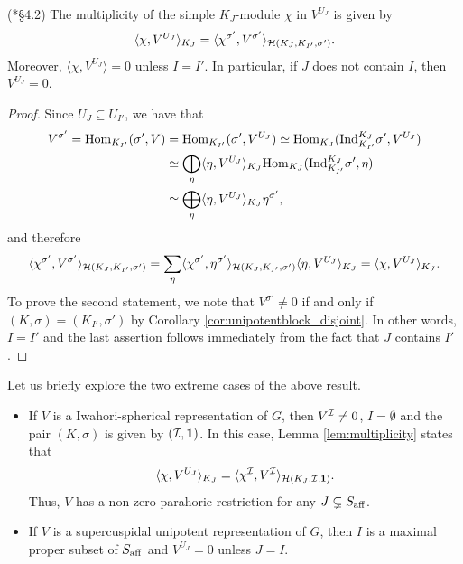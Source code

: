 \begin{lemma}\label{lem:multiplicity} (\cite{Reeder2000}*{\S 4.2})
    The multiplicity of the simple $K_J$-module $\chi$ in $V^{U_J}$ is given by 
    $$\langle\chi,V^{U_J}\rangle_{K_J}=\langle\chi^{\sigma'},V^{\sigma'}\rangle_{\mathcal{H}(K_J,K_{I'},\sigma')}.$$
    Moreover, $\langle\chi,V^{U_J}\rangle=0$ unless $I=I'$. In particular, if $J$ does not contain $I$, then $V^{U_J}=0$.
\end{lemma}
\begin{proof}
    Since $U_J\subseteq U_{I'}$, we have that
    \begin{align*}
        V^{\sigma'}=\mathrm{Hom}_{K_{I'}}(\sigma',V)&=\mathrm{Hom}_{K_{I'}}(\sigma',V^{U_J})\simeq\mathrm{Hom}_{K_J}(\mathrm{Ind}_{K_{I'}}^{K_J}\sigma',V^{U_J})\\
        &\simeq\bigoplus_\eta\langle\eta,V^{U_J}\rangle_{K_J}\mathrm{Hom}_{K_J}(\mathrm{Ind}_{K_{I'}}^{K_J}\sigma',\eta)\\
        &\simeq\bigoplus_\eta\langle\eta,V^{U_J}\rangle_{K_J}\eta^{\sigma'},
    \end{align*}
    and therefore
    \begin{equation*}
        \langle\chi^{\sigma'},V^{\sigma'}\rangle_{\mathcal{H}(K_J,K_{I'},\sigma')}=\sum_\eta\langle\chi^{\sigma'},\eta^{\sigma'}\rangle_{\mathcal{H}(K_J,K_{I'},\sigma')}\langle\eta,V^{U_J}\rangle_{K_J}=\langle\chi,V^{U_J}\rangle_{K_J}.
    \end{equation*}
    To prove the second statement, we note that $V^{\sigma'}\neq0$ if and only if $(K,\sigma)=(K_{I'},\sigma')$ by Corollary \ref{cor:unipotentblock_disjoint}. In other words, $I=I'$ and the last assertion follows immediately from the fact that $J$ contains $I'$.
\end{proof}

\begin{example}
    Let us briefly explore the two extreme cases of the above result.
    \begin{itemize}
        \item If $V$ is a Iwahori-spherical representation of $G$, then $V^{\mathcal{I}}\neq 0$, $I=\emptyset$ and the pair $(K,\sigma)$ is given by $(\mathcal{I},\mathbf{1})$. In this case, Lemma \ref{lem:multiplicity} states that 
        $$\langle\chi,V^{U_J}\rangle_{K_J}=\langle\chi^{\mathcal{I}},V^{\mathcal{I}}\rangle_{\mathcal{H}(K_J,\mathcal{I},\mathbf{1})}.$$
        Thus, $V$ has a non-zero parahoric restriction for any $J\subsetneq S_{\mathrm{aff}}$.
        \item If $V$ is a supercuspidal unipotent representation of $G$, then $I$ is a maximal proper subset of $S_{\mathrm{aff}}$ and $V^{U_J}=0$ unless $J=I$.
    \end{itemize}
\end{example}

